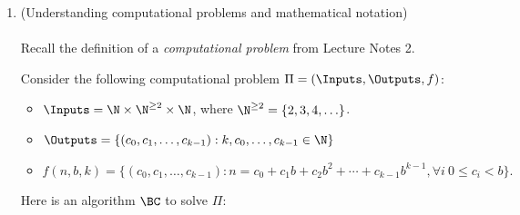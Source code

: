\documentclass[11pt]{article}
\begin{document}
\begin{enumerate}
\begin{enumerate}
\begin{enumerate}
    However, for $T^=$, every other integer it is $2^n$, so for any $c$ and $x_0$ witnesses, we can find some larger odd $x$ for which $2^x<c\cdot 4^x$, since $4^n=\omega(2^n)$. Therefore, by counterexample the statement $T(n)=\Omega(g)\implies T^==\Omega(g)$ is false.
    
    \bigskip

    \item (Optional question\footnote{This question will be graded only if you have seriously attempted all the other questions. It can only be used to increase your grade from an $R$ to an $R^+$.}) Prove that $T^{=}=O(g)$ iff $T=O(g)$. Thus the distinction between $T$ and $T^{=}$ does not matter when we are interested in "big-oh" runtime bounds, which are nondecreasing in most ``natural'' cases.

    (Hint: Recall the formal definition of big-O notation:
``there exist constants $c > 0$ and $n_0 \in \mathbb{N}$ such that for all
$n \geq n_0$, \ldots''. In the ``only if" direction, you'll need to find a constant $c$ such that the big-O inequality holds for $T$. Think about how to construct this based on the formal relationship between $T^=$ and $T$.)

    \end{enumerate}

    \end{enumerate}

    \newpage
    \item (Understanding computational problems and mathematical notation)\\\\
    Recall the definition of a {\em computational problem} from Lecture Notes 2.  \label{prob:BC}


    Consider the following computational problem $\Pi=(\Inputs,\Outputs,f)$:
    \begin{itemize}
    \item $\Inputs = \N\times\N^{\geq 2}\times \N$, where $\N^{\geq 2} = \{2,3,4,\ldots\}$.
    \item $\Outputs = \{(c_0,c_1,\ldots,c_{k-1}) : k,c_0,\ldots,c_{k-1}\in \N\}$
    \item $f(n,b,k) = \{ (c_0,c_1,\ldots,c_{k-1}) : n=c_0+c_1b+c_2b^2+\cdots+c_{k-1}b^{k-1}, \forall i\ 0\leq c_i< b\}.$
    \end{itemize}
Here is an algorithm $\BC$ to solve $\Pi$:

\begin{algorithm}[H]
    \\
    {
    \lElse{\Return{$\bot$}}}
\end{algorithm}



\end{enumerate}
\end{document}
